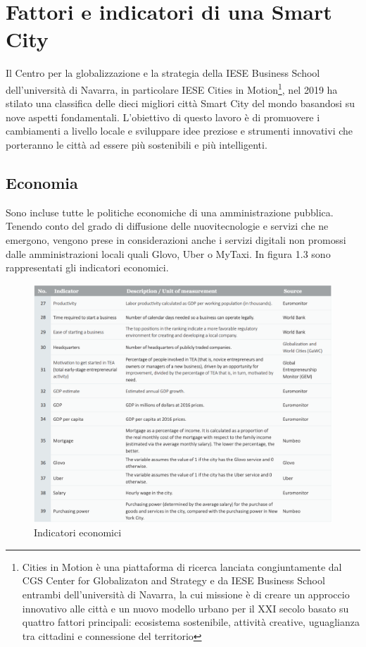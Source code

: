 \section{Fattori e indicatori di una Smart City}
Il Centro per la globalizzazione e la strategia della IESE Business School dell'università di Navarra, in particolare IESE Cities in Motion\footnote{Cities in Motion è una piattaforma di ricerca lanciata congiuntamente dal CGS Center for Globalizaton and Strategy e da IESE Business School entrambi dell'università di Navarra, la cui missione è di creare un approccio innovativo alle città e un nuovo modello urbano per il XXI secolo basato su quattro fattori principali: ecosistema sostenibile, attività creative, uguaglianza tra cittadini e connessione del territorio}, nel 2019 ha stilato una classifica delle dieci migliori città Smart City del mondo basandosi su nove aspetti fondamentali.\cite{iese_cities_2019}
L'obiettivo di questo lavoro è di promuovere i cambiamenti a livello locale e sviluppare idee preziose e strumenti innovativi che porteranno le città ad essere più sostenibili e più intelligenti. 


\subsection{Economia}
Sono incluse tutte le politiche economiche di una amministrazione pubblica. Tenendo conto del grado di diffusione delle nuovitecnologie e servizi che ne emergono, vengono prese in considerazioni anche i servizi digitali non promossi dalle amministrazioni locali quali Glovo, Uber o MyTaxi.
In figura 1.3 sono rappresentati gli indicatori economici.
\begin{figure}[h!]
	\begin{center}
		\includegraphics[width=320bp]{img/indicatori_economici.png}
		\caption{Indicatori economici}
	\end{center}
\end{figure}

